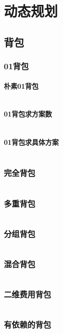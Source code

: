 \documentclass[a4paper,12pt]{article}
\begin{document}
\newpage
\section{动态规划}
\subsection{背包}
\subsubsection{01背包}
\paragraph{朴素01背包}
\inputminted[breaklines]{c++}{dp/bag/01.cc}
\paragraph{01背包求方案数}
\inputminted[breaklines]{c++}{dp/bag/sum.cc}
\paragraph{01背包求具体方案}
\inputminted[breaklines]{c++}{dp/bag/01_way.cc}
\subsubsection{完全背包}
\inputminted[breaklines]{c++}{dp/bag/comp.cc}
\subsubsection{多重背包}
\inputminted[breaklines]{c++}{dp/bag/mul.cc}
\subsubsection{分组背包}
\inputminted[breaklines]{c++}{dp/bag/group.cc}
\subsubsection{混合背包}
\inputminted[breaklines]{c++}{dp/bag/mix.cc}
\subsubsection{二维费用背包}
\inputminted[breaklines]{c++}{dp/bag/2di.cc}
\subsubsection{有依赖的背包}
\inputminted[breaklines]{c++}{dp/bag/dep.cc}
\end{document}
